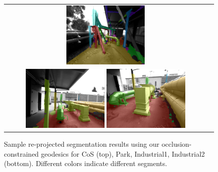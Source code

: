 \begin{figure}
\begin{center}
{{\begin{tabular}{cc}
        		{\includegraphics[width=0.4\textwidth]{figs/pipes2/sceneseg_0045.png}}
        		\\
        		{\includegraphics[width=0.4\textwidth]{figs/pipes3/sceneseg_0007.png}}
        		{\includegraphics[width=0.4\textwidth]{figs/pipes3/sceneseg_0081.png}}
              \end{tabular}
            }
      }
\end{center}
{}
   \caption{\small Sample re-projected segmentation results using our occlusion-constrained geodesics for CoS (top), Park, Industrial1, Industrial2 (bottom). Different colors indicate different segments.}
\label{fig:ourSegs}
{}
\end{figure}
